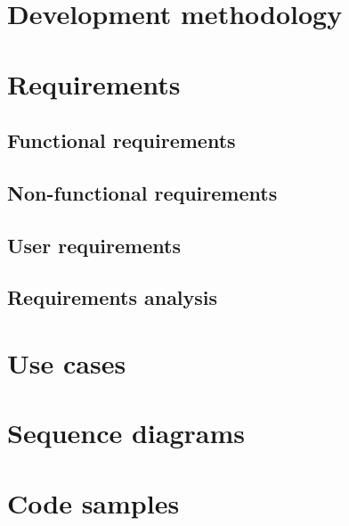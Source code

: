 \section{Development methodology}

\section{Requirements}

\subsection{Functional requirements}

\subsection{Non-functional requirements}

\subsection{User requirements}

\subsection{Requirements analysis}

\section{Use cases}

\section{Sequence diagrams}

\section{Code samples}
